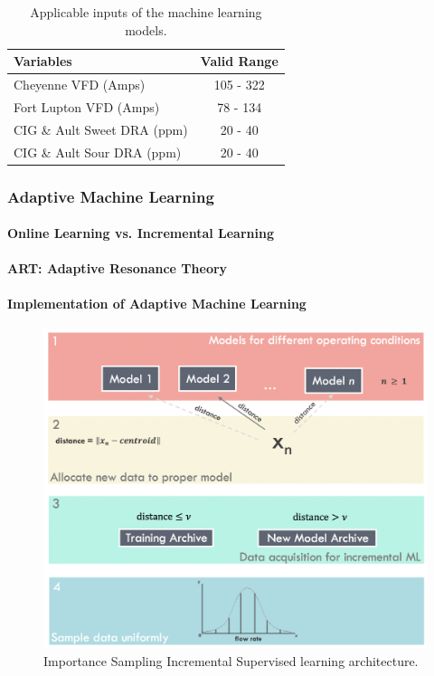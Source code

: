 \begin{table}[h]
    \centering
    {
    \begin{tabular}{ p{6cm} | c }
        Variables                               &  Valid Range            \\
        \hline
        Cheyenne VFD (Amps)                     &      105 - 322          \\
        Fort Lupton VFD (Amps)                  &      78 - 134           \\ 
        CIG \& Ault Sweet DRA (ppm)             &      20 - 40            \\
        CIG \& Ault Sour DRA (ppm)              &      20 - 40            \\
    \end{tabular}}
    \caption{Applicable inputs of the machine learning models.}
    \label{tab:08InputConst}
\end{table}

\subsubsection{Adaptive Machine Learning}
\paragraph{Online Learning vs. Incremental Learning}
\paragraph{ART: Adaptive Resonance Theory}
\paragraph{Implementation of Adaptive Machine Learning}

\begin{figure}
    \centering
    \includegraphics[width=\textwidth]{images/08IncrementalLearning.png}
    \caption{Importance Sampling Incremental Supervised learning architecture.}
    \label{fig:08ART}
\end{figure}

